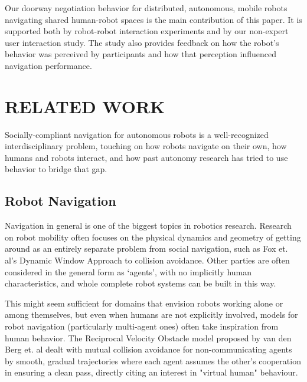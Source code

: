 \documentclass[letterpaper, 10 pt, conference]{ieeeconf}  %
\begin{document}




Our doorway negotiation behavior for distributed, autonomous, mobile robots navigating shared human-robot spaces is the main contribution of this paper. It is supported both by robot-robot interaction experiments and by our non-expert user interaction study. The study also provides feedback on how the robot’s behavior was perceived by participants and how that perception influenced navigation performance.


\section{RELATED WORK}

Socially-compliant navigation for autonomous robots is a well-recognized interdisciplinary problem, touching on how robots navigate on their own, how humans and robots interact, and how past autonomy research has tried to use behavior to bridge that gap.

\subsection{Robot Navigation}

Navigation in general is one of the biggest topics in robotics research. Research on robot mobility often focuses on the physical dynamics and geometry of getting around as an entirely separate problem from social navigation, such as Fox et. al's Dynamic Window Approach to collision avoidance\cite{c2}. Other parties are often considered in the general form as ‘agents’, with no implicitly human characteristics, and whole complete robot systems can be built in this way. 

This might seem sufficient for domains that envision robots working alone or among themselves, but even when humans are not explicitly involved, models for robot navigation (particularly multi-agent ones) often take inspiration from human behavior. The Reciprocal Velocity Obstacle model proposed by van den Berg et. al\cite{c3} dealt with mutual collision avoidance for non-communicating agents by smooth, gradual trajectories where each agent assumes the other’s cooperation in ensuring a clean pass, directly citing an interest in "virtual human" behaviour. 
\end{document}
